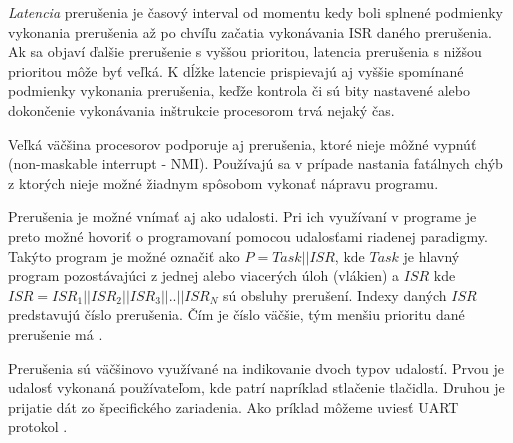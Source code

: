 \textit{Latencia} prerušenia je časový interval od momentu kedy boli splnené podmienky vykonania prerušenia až po chvíľu začatia vykonávania ISR daného prerušenia. Ak sa objaví ďalšie prerušenie s vyššou prioritou, latencia prerušenia s nižšou prioritou môže byť veľká. K dĺžke latencie prispievajú aj vyššie spomínané podmienky vykonania prerušenia, keďže kontrola či sú bity nastavené alebo dokončenie vykonávania inštrukcie procesorom trvá nejaký čas. \par
Veľká väčšina procesorov podporuje aj prerušenia, ktoré nieje môžné vypnúť (non-maskable interrupt - NMI). Používajú sa v prípade nastania fatálnych chýb z ktorých nieje možné žiadnym spôsobom vykonať nápravu programu.
\cite{regehrSafeStructuredUse2007} \par
Prerušenia je možné vnímať aj ako udalosti. Pri ich využívaní v programe je preto možné hovoriť o programovaní pomocou udalosťami riadenej paradigmy. Takýto program je možné označiť ako \begin{math}P=Task || ISR\end{math}, kde \begin{math}Task\end{math} je hlavný program pozostávajúci z jednej alebo viacerých úloh (vlákien) a  \begin{math}ISR\end{math} kde \begin{math}ISR=ISR_1||ISR_2||ISR_3||..||ISR_N\end{math} sú obsluhy prerušení.
Indexy daných \begin{math}ISR\end{math} predstavujú číslo prerušenia. Čím je číslo väčšie, tým menšiu prioritu dané prerušenie má \cite{wangAutomaticDetectionValidation2017}. \par Prerušenia sú väčšinovo využívané na indikovanie dvoch typov udalostí. Prvou je udalosť vykonaná používateľom, kde patrí napríklad stlačenie tlačidla. Druhou je prijatie dát zo špecifického zariadenia. Ako príklad môžeme uviesť UART protokol \cite{wangAutomaticDetectionValidation2017}.